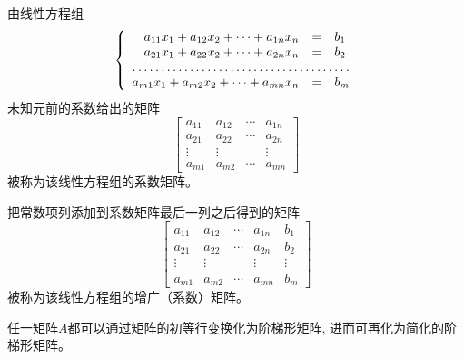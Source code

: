 \begin{Def}
由线性方程组
\begin{equation*}
\left\{ \begin{array}{rcl} a_{11}x_1 + a_{12}x_2 + \cdots + a_{1n}x_n & = & b_1 \\ a_{21}x_1 + a_{22}x_2 + \cdots + a_{2n}x_n & = & b_2 \\ \hdotsfor{3} \\ a_{m1}x_1 + a_{m2}x_2 + \cdots + a_{mn}x_n & = & b_m \end{array}\right.
\end{equation*}
未知元前的系数给出的矩阵
$$
\begin{bmatrix}
a_{11} & a_{12} & \cdots & a_{1n} \\ a_{21} & a_{22} & \cdots & a_{2n} \\ \vdots & \vdots & & \vdots \\ a_{m1} & a_{m2} & \cdots & a_{mn}
\end{bmatrix}
$$
被称为该线性方程组的系数矩阵。

把常数项列添加到系数矩阵最后一列之后得到的矩阵
$$
\begin{bmatrix}
a_{11} & a_{12} & \cdots & a_{1n}  & b_1 \\ a_{21} & a_{22} & \cdots & a_{2n} & b_2 \\ \vdots & \vdots & & \vdots & \vdots \\ a_{m1} & a_{m2} & \cdots & a_{mn} & b_m
\end{bmatrix}
$$
被称为该线性方程组的增广（系数）矩阵。
\end{Def}



\begin{prop}
任一矩阵$A$都可以通过矩阵的初等行变换化为阶梯形矩阵, 进而可再化为简化的阶梯形矩阵。
\end{prop}

